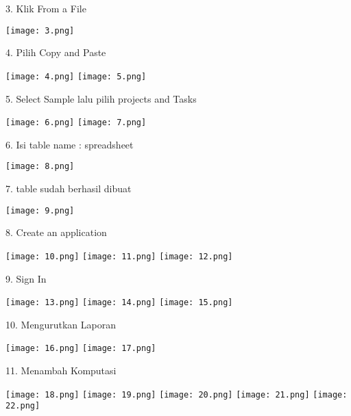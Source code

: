 \documentclass{article}
\begin{document}
    \item 3. Klik From a File
\begin{center}
    \texttt{[image: 3.png]}
    \end{center}
    
    
    \item 4. Pilih Copy and Paste
\begin{center}
    \texttt{[image: 4.png]}
    \texttt{[image: 5.png]}
    \end{center}
    
    \item 5. Select Sample lalu pilih projects and Tasks
\begin{center}
    \texttt{[image: 6.png]}
    \texttt{[image: 7.png]}
\end{center}
    
    \item 6. Isi table name : spreadsheet
\begin{center}
    \texttt{[image: 8.png]}
\end{center}

\item 7. table sudah berhasil dibuat
\begin{center}
  \texttt{[image: 9.png]}
\end{center}
   
\item 8. Create an application
\begin{center}
  \texttt{[image: 10.png]}
  \texttt{[image: 11.png]}
  \texttt{[image: 12.png]}
\end{center}

\item 9. Sign In
\begin{center}
  \texttt{[image: 13.png]}
  \texttt{[image: 14.png]}
  \texttt{[image: 15.png]}
\end{center}

\item 10. Mengurutkan Laporan
\begin{center}
  \texttt{[image: 16.png]}
  \texttt{[image: 17.png]}
  
\end{center}

\item 11. Menambah Komputasi
\begin{center}
    \texttt{[image: 18.png]}
    \texttt{[image: 19.png]}
    \texttt{[image: 20.png]}
    \texttt{[image: 21.png]}
    \texttt{[image: 22.png]}
\end{center}
\end{document}

